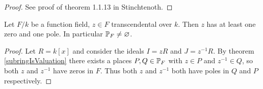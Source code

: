 \begin{proof}
	See proof of theorem 1.1.13 in Stinchtenoth. 
\end{proof}

\begin{corollary} \label{everyonesgotapole}
	Let $F/k$ be a function field, $z \in F$ transcendental 
	over $k$. Then $z$ has at least one zero and one pole. 
	In particular $\mathbb{P}_F \neq \varnothing $.
\end{corollary}

\begin{proof}
	Let $R=k[x]$ and consider the ideals $I= zR$ and $J=z^{-1}R$.
	By theorem \ref{subringIsValuation} there exists a places
	$P,Q\in \mathbb{P}_F$ with $z \in P$ and $z^{-1} \in Q$, so both
	$z$ and $z^{-1}$ have zeros in $F$. Thus both $z$ and $z^{-1}$ 
	both have poles in $Q$ and $P$ respectively.
\end{proof}
